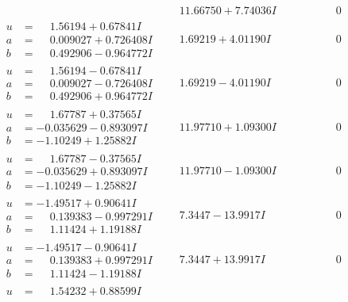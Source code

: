 \documentclass[1p]{elsarticle_modified}
\theoremstyle{definition}
\begin{document}
$$\begin{array}{c|c|c}
 & \phantom{-}11.66750 + 7.74036 I & \phantom{-0.000000 } 0 \\ \hline\begin{aligned}
u &= \phantom{-}1.56194 + 0.67841 I \\
a &= \phantom{-}0.009027 + 0.726408 I \\
b &= \phantom{-}0.492906 - 0.964772 I\end{aligned}
 & \phantom{-}1.69219 + 4.01190 I & \phantom{-0.000000 } 0 \\ \hline\begin{aligned}
u &= \phantom{-}1.56194 - 0.67841 I \\
a &= \phantom{-}0.009027 - 0.726408 I \\
b &= \phantom{-}0.492906 + 0.964772 I\end{aligned}
 & \phantom{-}1.69219 - 4.01190 I & \phantom{-0.000000 } 0 \\ \hline\begin{aligned}
u &= \phantom{-}1.67787 + 0.37565 I \\
a &= -0.035629 - 0.893097 I \\
b &= -1.10249 + 1.25882 I\end{aligned}
 & \phantom{-}11.97710 + 1.09300 I & \phantom{-0.000000 } 0 \\ \hline\begin{aligned}
u &= \phantom{-}1.67787 - 0.37565 I \\
a &= -0.035629 + 0.893097 I \\
b &= -1.10249 - 1.25882 I\end{aligned}
 & \phantom{-}11.97710 - 1.09300 I & \phantom{-0.000000 } 0 \\ \hline\begin{aligned}
u &= -1.49517 + 0.90641 I \\
a &= \phantom{-}0.139383 - 0.997291 I \\
b &= \phantom{-}1.11424 + 1.19188 I\end{aligned}
 & \phantom{-}7.3447 - 13.9917 I & \phantom{-0.000000 } 0 \\ \hline\begin{aligned}
u &= -1.49517 - 0.90641 I \\
a &= \phantom{-}0.139383 + 0.997291 I \\
b &= \phantom{-}1.11424 - 1.19188 I\end{aligned}
 & \phantom{-}7.3447 + 13.9917 I & \phantom{-0.000000 } 0 \\ \hline\begin{aligned}
u &= \phantom{-}1.54232 + 0.88599 I \\

\end{aligned}
\end{array}$$
\end{document}
